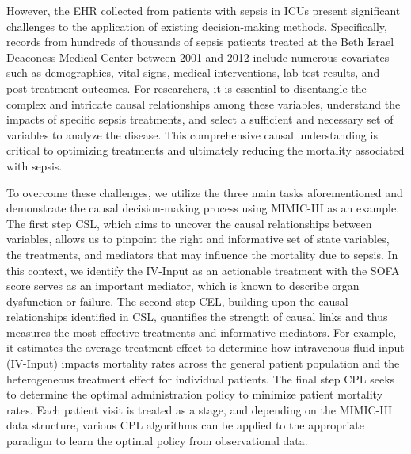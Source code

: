 However, the \acrfull{EHR} collected from patients with sepsis in ICUs present significant challenges to the application of existing decision-making methods. Specifically, records from hundreds of thousands of sepsis patients treated at the Beth Israel Deaconess Medical Center between 2001 and 2012 include numerous covariates such as demographics, vital signs, medical interventions, lab test results, and post-treatment outcomes. For researchers, it is essential to disentangle the complex and intricate causal relationships among these variables, understand the impacts of specific sepsis treatments, and select a sufficient and necessary set of variables to analyze the disease. This comprehensive causal understanding is critical to optimizing treatments and ultimately reducing the mortality associated with sepsis. 

To overcome these challenges, we utilize the three main tasks aforementioned and demonstrate the causal decision-making process using \acrshort{MIMIC-III} as an example. The first step \acrshort{CSL}, which aims to uncover the causal relationships between variables, allows us to pinpoint the right and informative set of state variables, the treatments, and mediators that may influence the mortality due to sepsis. In this context, we identify the IV-Input as an actionable treatment with the \acrfull{SOFA} score serves as an important mediator, which is known to describe organ dysfunction or failure. %
The second step \acrshort{CEL}, building upon the causal relationships identified in \acrshort{CSL}, quantifies the strength of causal links and thus measures the most effective treatments and informative mediators. For example, it estimates the average treatment effect to determine how intravenous fluid input (IV-Input) impacts mortality rates across the general patient population and the heterogeneous treatment effect for individual patients. %
The final step \acrshort{CPL} seeks to determine the optimal administration policy to minimize patient mortality rates. Each patient visit is treated as a stage, and depending on the \acrshort{MIMIC-III} data structure, various \acrshort{CPL} algorithms can be applied to the appropriate paradigm to learn the optimal policy from observational data.




